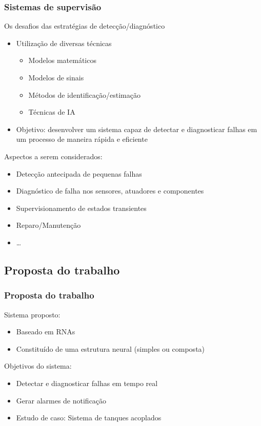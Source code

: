 \documentclass{beamer}
\begin{document}
\begin{frame}
    \frametitle{Sistemas de supervisão}

    Os desafios das estratégias de detecção/diagnóstico

\begin{itemize}
    \item Utilização de diversas técnicas
    \begin{itemize}
        \item Modelos matemáticos
        \item Modelos de sinais
        \item Métodos de identificação/estimação
        \item \alert{Técnicas de IA}
    \end{itemize}
    \item Objetivo: desenvolver um sistema capaz de detectar e diagnosticar
          falhas em um processo de maneira rápida e eficiente
\end{itemize}

Aspectos a serem considerados:

\begin{itemize}
    \item Detecção antecipada de pequenas falhas
    \item Diagnóstico de falha nos sensores, atuadores e componentes
    \item Supervisionamento de estados transientes
    \item Reparo/Manutenção
    \item \ldots
\end{itemize}
\end{frame}

\subsection{Proposta do trabalho}
\begin{frame}
    \frametitle{Proposta do trabalho}

    Sistema proposto:

\begin{itemize}
    \item Baseado em RNAs
    \item Constituído de uma estrutura neural (simples ou composta)
\end{itemize}

    Objetivos do sistema:

\begin{itemize}
    \item Detectar e diagnosticar falhas em tempo real
    \item Gerar alarmes de notificação
    \item Estudo de caso: Sistema de tanques acoplados
\end{itemize}

\end{frame}
\end{document}
